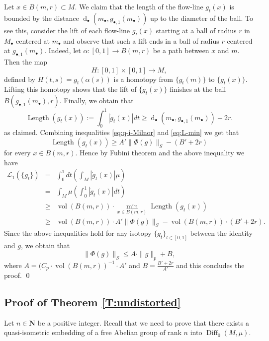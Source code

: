 \documentclass[a4paper,12pt]{amsart}
\def\Diff{\operatorname{Diff}}
\def\a{\alpha}
\def\vol{\operatorname{vol}}
\theoremstyle{definition}
\def\OP{\operatorname}
\def\B{\mathbf}
\begin{document}
Let $x\in B(m,r)\subset M$. We claim that the length of the flow-line
$g_t(x)$ is bounded by the distance
$\OP{d}_{\bullet}(m_{\bullet},g_{\bullet,1}(m_{\bullet}))$ up to the
diameter of the ball. To see this, consider the lift of each flow-line
$g_t(x)$ starting at a ball of radius $r$ in $M_{\bullet}$ centered at
$m_{\bullet}$ and observe that such a lift ends in a ball of radius
$r$ centered at $g_{\bullet,1}(m_{\bullet})$.
Indeed, let
$\a\colon [0,1]\to B(m,r)$ be a path between $x$ and $m$. Then the
map
$$
H:[0,1]\times[0,1]\to M,
$$
defined by $H(t,s)=g_t(\a(s))$ is
a homotopy from $\{g_t(m)\}$ to $\{g_t(x)\}$.
Lifting this homotopy shows that the lift of
$\{g_t(x)\}$ finishes at the ball $B(g_{\bullet,1}(m_{\bullet}),r)$.
Finally, we obtain that
\begin{equation}\label{eq:L-min}
\OP{Length}(g_t(x)):=\int_0^1|\dot{g}_t(x)|dt
\geq \OP{d}_{\bullet}({m}_{\bullet},{g}_{\bullet,1}({m}_{\bullet}))-2r.
\end{equation}
as claimed.
Combining inequalities \eqref{eq:q-i-Milnor} and \eqref{eq:L-min} we get that
\begin{equation*}
\OP{Length}(g_t(x))\geq A'\|\Phi(g)\|_S-(B'+2r)
\end{equation*}
for every $x\in B(m,r)$.
Hence by Fubini theorem and the above inequality we have
\begin{eqnarray*}
\mathcal{L}_1(\{g_t\})&=&\int_0^1 dt\left(\int_{M}|\dot{g}_t(x)|\mu\right) \\
&=&\int_{M}\mu \left(\int_0^1|\dot{g}_t(x)|dt\right)\\
&\geq& \vol(B(m,r))\cdot \min_{x\in B(m,r)}\OP{Length}(g_t(x))\\
&\geq&  \vol(B(m,r))\cdot A'\|\Phi(g)\|_S-\vol(B(m,r))\cdot(B'+2r).
\end{eqnarray*}
Since the above inequalities hold for any isotopy
$\{g_t\}_{t\in[0,1]}$ between the identity and $g$,
we obtain that
\begin{equation*}
\|\Phi(g)\|_S\leq A\cdot \|g\|_p+B,
\end{equation*}
where $A=(C_p\cdot \vol(B(m,r))^{-1}\cdot A'$ and $B=\frac{B'+2r}{A'}$
and this concludes the proof.
\qed

\subsection{Proof of Theorem \ref{T:undistorted}}
\label{SS:proof_undistorted}

Let $n\in \B N$ be a positive integer.
Recall that we need to prove that there exists a
quasi-isometric embedding of a free Abelian group
of rank $n$ into $\Diff_0(M,\mu)$.
\end{document}
